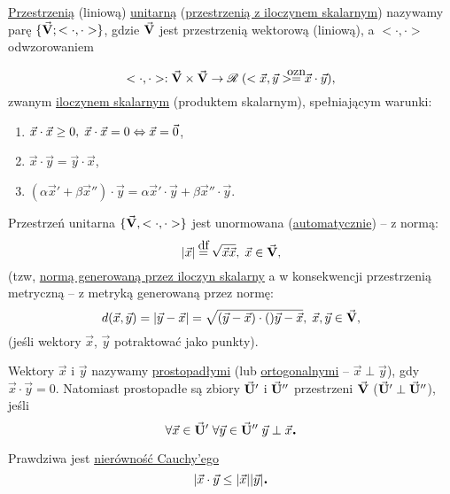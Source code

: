 \begin{mydef}
   \underline{Przestrzenią} (liniową) \underline{unitarną} (\underline{przestrzenią z iloczynem skalarnym}) nazywamy parę $\{\vec{\mathbf{V}}; <\cdot, \cdot>\}$, gdzie $\vec{\mathbf{V}}$ jest przestrzenią wektorową (liniową), a $<\cdot, \cdot>$ odwzorowaniem
   
   \[<\cdot, \cdot>: \vset{V} \times \vset{V} \to \real \; (<\vec{x}, \vec{y}> \ozn \vec{x} \cdot \vec{y}),\]
   zwanym \underline{iloczynem skalarnym} (produktem skalarnym), spełniającym warunki:
   
   \begin{enumerate}
    \item $\vec{x} \cdot \vec{x} \geq 0, \; \vec{x} \cdot \vec{x} = 0 \Leftrightarrow \vec{x} = \vec{0}$,
    \item $\vec{x} \cdot \vec{y} = \vec{y} \cdot \vec{x}$,
    \item $(\alpha \vec{x}' + \beta \vec{x}'') \cdot \vec{y} = \alpha \vec{x}' \cdot \vec{y} + \beta \vec{x}'' \cdot \vec{y}$.
   \end{enumerate}

\end{mydef}

\begin{info}
   Przestrzeń unitarna $\{\vec{\mathbf{V}}, <\cdot, \cdot>\}$ jest unormowana (\underline{automatycznie}) -- z normą:
   \[|\vec{x}| \df \sqrt{\vec{x} \vec{x}}, \; \vec{x} \in \vset{V},\]
   (tzw, \underline{normą generowaną przez iloczyn skalarny} a w konsekwencji przestrzenią metryczną -- z metryką generowaną przez normę:
   \[d(\vec{x}, \vec{y}) = |\vec{y}-\vec{x}| = \sqrt{(\vec{y}-\vec{x})\cdot()\vec{y}-\vec{x}}, \; \vec{x},\vec{y} \in \vec{\mathbf{V}},\]
   (jeśli wektory $\vec{x}$, $\vec{y}$ potraktować jako punkty).
\end{info}

\begin{mydef}
   Wektory $\vec{x}$ i $\vec{y}$ nazywamy \underline{prostopadłymi} (lub \underline{ortogonalnymi} -- $\vec{x} \perp \vec{y}$), gdy $\vec{x} \cdot \vec{y} = 0$. Natomiast prostopadłe są zbiory $\vec{\mathbf{U}}'$ i $\vec{\mathbf{U}}''$ przestrzeni $\vec{\mathbf{V}}$ ($\vec{\mathbf{U}}' \perp \vec{\mathbf{U}}''$), jeśli
   \[\forall \vec{x} \in \vec{\mathbf{U}}' \; \forall \vec{y} \in \vec{\mathbf{U}}''\; \vec{y} \perp \vec{x} \mbox{\large\bfseries .}\]
\end{mydef}

\begin{info}
   Prawdziwa jest \underline{nierówność Cauchy'ego}
   \[|\vec{x} \cdot \vec{y} \leq |\vec{x}| |\vec{y}| \mbox{\large\bfseries .}\]
\end{info}

